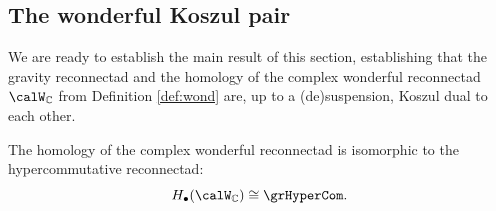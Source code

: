 \subsection{The wonderful Koszul pair}

We are ready to establish the main result of this section, establishing that the gravity reconnectad and the homology of the complex wonderful reconnectad $\calW_{\mathbb{C}}$ from Definition \ref{def:wond} are, up to a (de)suspension, Koszul dual to each other.

\begin{theorem}\label{th:homologyhyper}
The homology of the complex wonderful reconnectad is isomorphic to the hypercommutative reconnectad:
 \[
H_{\bullet}(\calW_{\mathbb{C}}) \cong \grHyperCom.
 \]
\end{theorem}

